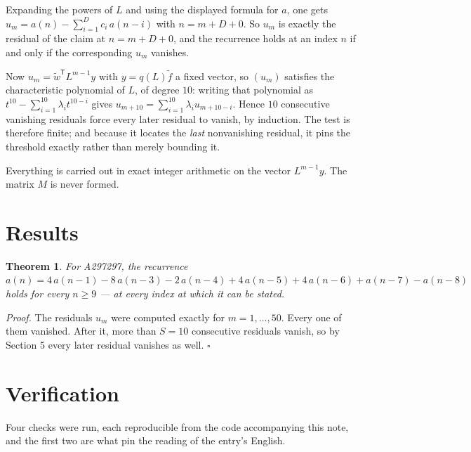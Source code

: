 \documentclass[11pt]{article}
\newtheorem{theorem}{Theorem}
\theoremstyle{definition}
\begin{document}
Expanding the powers of $L$ and using the displayed formula for $a$, one gets $u_m = a(n) - \sum_{i=1}^{D} c_i\,a(n-i)$ with $n = m + D + 0$. So $u_m$ is exactly the residual of the claim at $n = m + D + 0$, and the recurrence holds at an index $n$ if and only if the corresponding $u_m$ vanishes.

Now $u_m = \tilde w^{\mathsf T} L^{m-1} y$ with $y = q(L)\tilde f$ a fixed vector, so $(u_m)$ satisfies the characteristic polynomial of $L$, of degree $10$: writing that polynomial as $t^{10} - \sum_{i=1}^{10} \lambda_i t^{10-i}$ gives $u_{m+10} = \sum_{i=1}^{10} \lambda_i u_{m+10-i}$. Hence $10$ consecutive vanishing residuals force every later residual to vanish, by induction. The test is therefore finite; and because it locates the {\itshape last} nonvanishing residual, it pins the threshold exactly rather than merely bounding it.

Everything is carried out in exact integer arithmetic on the vector $L^{m-1}y$. The matrix $M$ is never formed.

\section{Results}

\begin{theorem} For A297297, the recurrence $a(n) = 4\,a(n-1) - 8\,a(n-3) - 2\,a(n-4) + 4\,a(n-5) + 4\,a(n-6) + a(n-7) - a(n-8)$ holds for every $n \ge 9$ --- at every index at which it can be stated.\end{theorem}

{\itshape Proof.} The residuals $u_m$ were computed exactly for $m = 1,\dots,50$. Every one of them vanished. After it, more than $S = 10$ consecutive residuals vanish, so by Section 5 every later residual vanishes as well. $\square$

\section{Verification}

Four checks were run, each reproducible from the code accompanying this note, and the first two are what pin the reading of the entry's English.
\end{document}
